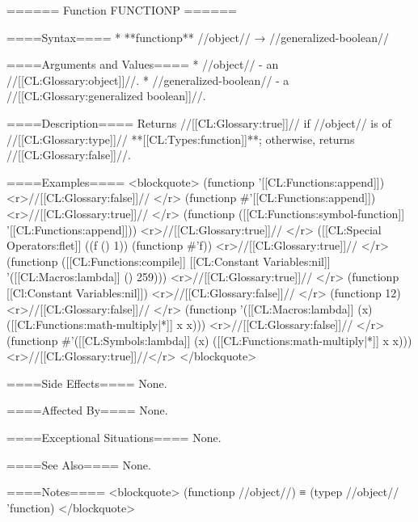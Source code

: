 ====== Function FUNCTIONP ======

====Syntax====
  * **functionp** //object// → //generalized-boolean//

====Arguments and Values====
  * //object// - an //[[CL:Glossary:object]]//.
  * //generalized-boolean// - a //[[CL:Glossary:generalized boolean]]//.

====Description====
Returns //[[CL:Glossary:true]]// if //object// is of //[[CL:Glossary:type]]// **[[CL:Types:function]]**; otherwise, returns //[[CL:Glossary:false]]//.

====Examples====
<blockquote>
(functionp '[[CL:Functions:append]]) <r>//[[CL:Glossary:false]]// </r>
(functionp #'[[CL:Functions:append]]) <r>//[[CL:Glossary:true]]// </r>
(functionp ([[CL:Functions:symbol-function]] '[[CL:Functions:append]])) <r>//[[CL:Glossary:true]]// </r>
([[CL:Special Operators:flet]] ((f () 1)) (functionp #'f)) <r>//[[CL:Glossary:true]]// </r>
(functionp ([[CL:Functions:compile]] [[CL:Constant Variables:nil]] '([[CL:Macros:lambda]] () 259))) <r>//[[CL:Glossary:true]]// </r>
(functionp [[Cl:Constant Variables:nil]]) <r>//[[CL:Glossary:false]]// </r>
(functionp 12) <r>//[[CL:Glossary:false]]// </r>
(functionp '([[CL:Macros:lambda]] (x) ([[CL:Functions:math-multiply|*]] x x))) <r>//[[CL:Glossary:false]]// </r>
(functionp #'([[CL:Symbols:lambda]] (x) ([[CL:Functions:math-multiply|*]] x x))) <r>//[[CL:Glossary:true]]//</r>
</blockquote>

====Side Effects====
None.

====Affected By====
None.

====Exceptional Situations====
None.

====See Also====
None.

====Notes====
<blockquote> (functionp //object//) ≡ (typep //object// 'function) </blockquote>

